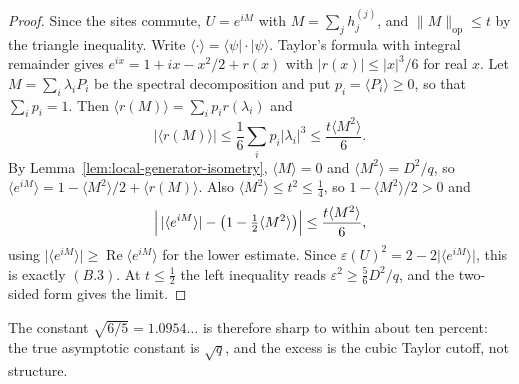 \begin{proof}
Since the sites commute, \(U=e^{iM}\) with \(M=\sum_jh_j^{(j)}\), and
\(\lVert M\rVert_{\mathrm{op}}\leq t\) by the triangle inequality.  Write
\(\langle\cdot\rangle=\langle\psi\rvert\cdot\lvert\psi\rangle\).  Taylor's
formula with integral remainder gives
\(e^{ix}=1+ix-x^2/2+r(x)\) with \(\lvert r(x)\rvert\leq\lvert x\rvert^3/6\)
for real \(x\).  Let \(M=\sum_i\lambda_iP_i\) be the spectral decomposition
and put \(p_i=\langle P_i\rangle\geq0\), so that \(\sum_ip_i=1\).  Then
\(\langle r(M)\rangle=\sum_ip_ir(\lambda_i)\) and
\[
 \lvert\langle r(M)\rangle\rvert
  \leq\frac16\sum_ip_i\lvert\lambda_i\rvert^3
  \leq\frac{t\langle M^2\rangle}6 .
\]
By Lemma~\ref{lem:local-generator-isometry}, \(\langle M\rangle=0\) and
\(\langle M^2\rangle=D^2/q\), so
\(\langle e^{iM}\rangle=1-\langle M^2\rangle/2+\langle r(M)\rangle\).
Also \(\langle M^2\rangle\leq t^2\leq\frac14\), so
\(1-\langle M^2\rangle/2>0\) and
\[
 \Bigl\lvert\,\lvert\langle e^{iM}\rangle\rvert
   -\bigl(1-\tfrac12\langle M^2\rangle\bigr)\Bigr\rvert
 \leq\frac{t\langle M^2\rangle}6 ,
\]
using \(\lvert\langle e^{iM}\rangle\rvert\geq
\operatorname{Re}\langle e^{iM}\rangle\) for the lower estimate.  Since
\(\varepsilon(U)^2=2-2\lvert\langle e^{iM}\rangle\rvert\), this is exactly
\((B.3)\).  At \(t\leq\frac12\) the left inequality reads
\(\varepsilon^2\geq\frac56D^2/q\), and the two-sided form gives the
limit.
\end{proof}

The constant \(\sqrt{6/5}=1.0954\ldots\) is therefore sharp to within about
ten percent: the true asymptotic constant is \(\sqrt q\), and the excess is
the cubic Taylor cutoff, not structure.

